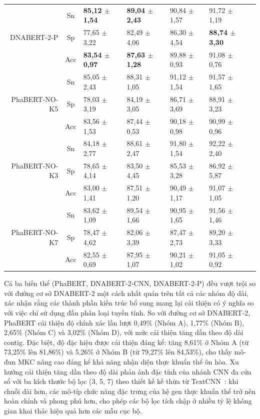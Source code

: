 \begin{table}[h]
{\begin{tabular}{rclllll}
        \multirow{3}{*}{DNABERT-2-P} & Sn  & \textbf{85,12 $\pm$ 1,54} & \textbf{89,04 $\pm$ 2,43} & 90,84 $\pm$ 1,57 & 91,72 $\pm$ 1,19 \\
                                 & Sp  & 77,65 $\pm$ 3,22 & 82,49 $\pm$ 4,06 & 86,30 $\pm$ 4,54 & \textbf{88,74 $\pm$ 3,30} \\
                                 & Acc & \textbf{83,54 $\pm$ 0,97} & \textbf{87,63 $\pm$ 1,28} & 89,88 $\pm$ 0,93 & 91,08 $\pm$ 0,76 \\ \hline
        \multirow{3}{*}{PhaBERT-NO-K5} & Sn  & 85,05 $\pm$ 2,43 & 88,31 $\pm$ 1,05 & 91,12 $\pm$ 1,54 & 91,57 $\pm$ 1,65 \\
                                 & Sp  & 78,03 $\pm$ 3,19 & 84,19 $\pm$ 3,05 & 86,71 $\pm$ 3,69 & 88,91 $\pm$ 3,23 \\
                                 & Acc & 83,56 $\pm$ 1,53 & 87,44 $\pm$ 0,53 & 90,18 $\pm$ 0,98 & 90,99 $\pm$ 0,96 \\ \hline
        \multirow{3}{*}{PhaBERT-NO-K3} & Sn  & 84,18 $\pm$ 2,77 & 88,61 $\pm$ 2,47 & 91,80 $\pm$ 1,54 & 92,22 $\pm$ 2,40 \\
                                 & Sp  & 78,65 $\pm$ 4,14 & 83,50 $\pm$ 4,45 & 85,53 $\pm$ 3,28 & 86,92 $\pm$ 5,87 \\
                                 & Acc & 83,00 $\pm$ 1,41 & 87,51 $\pm$ 1,20 & 90,49 $\pm$ 1,17 & 91,07 $\pm$ 1,05 \\ \hline
        \multirow{3}{*}{PhaBERT-NO-K7} & Sn  & 83,62 $\pm$ 1,09 & 89,54 $\pm$ 1,66 & 90,95 $\pm$ 1,65 & 91,56 $\pm$ 1,46 \\
                                 & Sp  & 78,47 $\pm$ 4,62 & 82,06 $\pm$ 3,39 & 87,47 $\pm$ 2,73 & 89,20 $\pm$ 3,33 \\
                                 & Acc & 82,55 $\pm$ 0,69 & 87,95 $\pm$ 1,07 & 90,21 $\pm$ 1,02 & 91,05 $\pm$ 0,92 \\ \hline
    \end{tabular}%
    }
\end{table}

Cả ba biến thể (PhaBERT, DNABERT-2-CNN, DNABERT-2-P) đều vượt trội so với đường cơ sở DNABERT-2 một cách nhất quán trên tất cả các nhóm độ dài, xác nhận rằng các thành phần kiến trúc bổ sung mang lại cải thiện có ý nghĩa so với việc chỉ sử dụng đầu phân loại tuyến tính. So với đường cơ sở DNABERT-2, PhaBERT cải thiện độ chính xác lần lượt 0,49\% (Nhóm A), 1,77\% (Nhóm B), 2,65\% (Nhóm C) và 3,02\% (Nhóm D), với mức cải thiện tăng dần theo độ dài contig. Đặc biệt, độ đặc hiệu được cải thiện đáng kể: tăng 8,61\% ở Nhóm A (từ 73,25\% lên 81,86\%) và 5,26\% ở Nhóm B (từ 79,27\% lên 84,53\%), cho thấy mô-đun MKC nâng cao đáng kể khả năng nhận diện thực khuẩn thể ôn hòa. Xu hướng cải thiện tăng dần theo độ dài phản ánh đặc tính của nhánh CNN đa cửa sổ với ba kích thước bộ lọc (3, 5, 7) theo thiết kế kế thừa từ TextCNN~\cite{kim2014convolutional}: khi chuỗi dài hơn, các mô-típ chức năng đặc trưng của hệ gen thực khuẩn thể trở nên hoàn chỉnh và phong phú hơn, cho phép các bộ lọc tích chập ở nhiều tỷ lệ không gian khai thác hiệu quả hơn các mẫu cục bộ.

